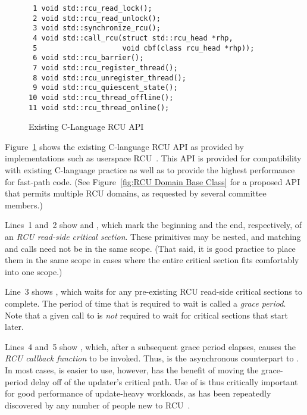 \documentclass[letterpaper,10pt]{article}
\begin{document}
\begin{figure}[tbp]
{ \scriptsize
\begin{verbatim}
 1 void std::rcu_read_lock();
 2 void std::rcu_read_unlock();
 3 void std::synchronize_rcu();
 4 void std::call_rcu(struct std::rcu_head *rhp,
 5                    void cbf(class rcu_head *rhp));
 6 void std::rcu_barrier();
 7 void std::rcu_register_thread();
 8 void std::rcu_unregister_thread();
 9 void std::rcu_quiescent_state();
10 void std::rcu_thread_offline();
11 void std::rcu_thread_online();
\end{verbatim}
}
\caption{Existing C-Language RCU API}
\label{fig:Existing C-Language RCU API}
\end{figure}

Figure~\ref{fig:Existing C-Language RCU API}
shows the existing C-language RCU API as provided by implementations such as
userspace RCU~\cite{MathieuDesnoyers2009URCU,PaulMcKenney2013LWNURCU}.
This API is provided for compatibility with existing C-language practice as
well as to provide the highest performance for fast-path code.
(See Figure~\ref{fig:RCU Domain Base Class} for a proposed API that
permits multiple RCU domains, as requested by several committee members.)

Lines~1 and~2 show  and ,
which mark the beginning and the end, respectively, of an \emph{RCU read-side
critical section}.
These primitives may be nested, and matching 
and  calls need not be in the same scope.
(That said, it is good practice to place them in the same scope
in cases where the entire critical section fits comfortably into
one scope.)

Line~3 shows , which waits for any pre-existing
RCU read-side critical sections to complete.
The period of time that  is required to wait is
called a \emph{grace period}.
Note that a given call to  is \emph{not} required to
wait for critical sections that start later.

Lines~4 and~5 show , which, after a subsequent grace period
elapses, causes the  \emph{RCU callback function} to be invoked.
Thus,  is the asynchronous counterpart to
.
In most cases,  is easier to use, however, 
has the benefit of moving the grace-period delay off of the updater's
critical path.
Use of  is thus critically important for good performance of
update-heavy workloads, as has been repeatedly discovered by any number of
people new to RCU~\cite{PaulEMcKenney2015ReadMostly}.
\end{document}

